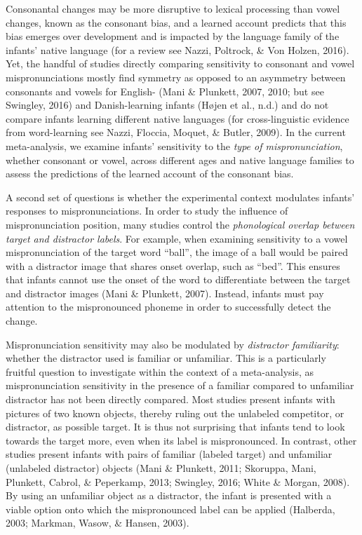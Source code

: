 \documentclass[
  man, noextraspace]{apa6}
\begin{document}
Consonantal changes may be more disruptive to lexical processing than vowel changes, known as the consonant bias, and a learned account predicts that this bias emerges over development and is impacted by the language family of the infants' native language (for a review see Nazzi, Poltrock, \& Von Holzen, 2016). Yet, the handful of studies directly comparing sensitivity to consonant and vowel mispronunciations mostly find symmetry as opposed to an asymmetry between consonants and vowels for English- (Mani \& Plunkett, 2007, 2010; but see Swingley, 2016) and Danish-learning infants (Højen et al., n.d.) and do not compare infants learning different native languages (for cross-linguistic evidence from word-learning see Nazzi, Floccia, Moquet, \& Butler, 2009). In the current meta-analysis, we examine infants' sensitivity to the \emph{type of mispronunciation}, whether consonant or vowel, across different ages and native language families to assess the predictions of the learned account of the consonant bias.

A second set of questions is whether the experimental context modulates infants' responses to mispronunciations. In order to study the influence of mispronunciation position, many studies control the \emph{phonological overlap between target and distractor labels}. For example, when examining sensitivity to a vowel mispronunciation of the target word \enquote{ball}, the image of a ball would be paired with a distractor image that shares onset overlap, such as \enquote{bed}. This ensures that infants cannot use the onset of the word to differentiate between the target and distractor images (Mani \& Plunkett, 2007). Instead, infants must pay attention to the mispronounced phoneme in order to successfully detect the change.

Mispronunciation sensitivity may also be modulated by \emph{distractor familiarity}: whether the distractor used is familiar or unfamiliar. This is a particularly fruitful question to investigate within the context of a meta-analysis, as mispronunciation sensitivity in the presence of a familiar compared to unfamiliar distractor has not been directly compared. Most studies present infants with pictures of two known objects, thereby ruling out the unlabeled competitor, or distractor, as possible target. It is thus not surprising that infants tend to look towards the target more, even when its label is mispronounced. In contrast, other studies present infants with pairs of familiar (labeled target) and unfamiliar (unlabeled distractor) objects (Mani \& Plunkett, 2011; Skoruppa, Mani, Plunkett, Cabrol, \& Peperkamp, 2013; Swingley, 2016; White \& Morgan, 2008). By using an unfamiliar object as a distractor, the infant is presented with a viable option onto which the mispronounced label can be applied (Halberda, 2003; Markman, Wasow, \& Hansen, 2003).
\end{document}
